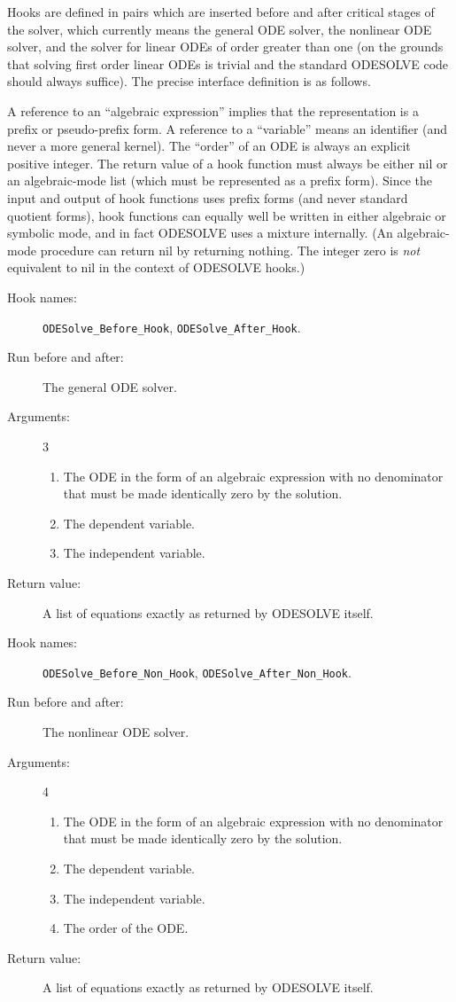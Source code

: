 Hooks are defined in pairs which are inserted before and after
critical stages of the solver, which currently means the general ODE
solver, the nonlinear ODE solver, and the solver for linear ODEs of
order greater than one (on the grounds that solving first order linear
ODEs is trivial and the standard ODESOLVE code should always
suffice).  The precise interface definition is as follows.

A reference to an ``algebraic expression'' implies that the \REDUCE{}
representation is a prefix or pseudo-prefix form.  A reference to a
``variable'' means an identifier (and never a more general kernel).
The ``order'' of an ODE is always an explicit positive integer.  The
return value of a hook function must always be either nil or an
algebraic-mode list (which must be represented as a prefix form).
Since the input and output of hook functions uses prefix forms (and
never standard quotient forms), hook functions can equally well be
written in either algebraic or symbolic mode, and in fact ODESOLVE
uses a mixture internally.  (An algebraic-mode procedure can return
nil by returning nothing.  The integer zero is \emph{not} equivalent
to nil in the context of ODESOLVE hooks.)

\noindent\hrulefill

\begin{description}
\item[Hook names:] \verb|ODESolve_Before_Hook|,
\verb|ODESolve_After_Hook|.
\item[Run before and after:] The general ODE solver.
\item[Arguments:] 3
\begin{enumerate}
\item The ODE in the form of an algebraic expression with no
denominator that must be made identically zero by the solution.
\item The dependent variable.
\item The independent variable.
\end{enumerate}
\item[Return value:] A list of equations exactly as returned by
ODESOLVE itself.
\end{description}

\noindent\hrulefill

\begin{description}
\item[Hook names:] \verb|ODESolve_Before_Non_Hook|,
\verb|ODESolve_After_Non_Hook|.
\item[Run before and after:] The nonlinear ODE solver.
\item[Arguments:] 4
\begin{enumerate}
\item The ODE in the form of an algebraic expression with no
denominator that must be made identically zero by the solution.
\item The dependent variable.
\item The independent variable.
\item The order of the ODE.
\end{enumerate}
\item[Return value:] A list of equations exactly as returned by
ODESOLVE itself.
\end{description}

